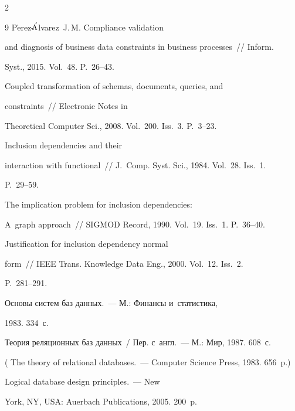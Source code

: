 \begin{multicols}{2}
{{\begin{thebibliography}{9}
{P$\acute{\mbox{e}}$rez-$\acute{\mbox{\!\!A}}$lvarez~J.\,M.} Compliance validation

and diagnosis of business data constraints in business processes~// Inform.

Syst., 2015. Vol.~48. P.~26--43.


 Coupled transformation of schemas, documents, queries, and

constraints~// Electronic Notes in

Theoretical Computer Sci., 2008. Vol.~200. Iss.~3. P.~3--23.






 Inclusion dependencies and their

interaction with functional~// J.~Comp. Syst. Sci., 1984. Vol.~28. Iss.~1.

P.~29--59.


 The implication problem for inclusion dependencies:

A~graph approach~// SIGMOD Record, 1990. Vol.~19. Iss.~1. P.~36--40.


 Justification for inclusion dependency normal

form~// IEEE Trans. Knowledge Data Eng., 2000. Vol.~12. Iss.~2.

P.~281--291.




 Основы систем баз данных.~--- М.: Финансы и~статистика,

1983. 334~с.




 Теория реляционных баз данных~/ Пер. с~англ.~--- М.: Мир, 1987. 608~с.

( The theory of relational databases.~--- Computer Science Press, 1983. 656~p.)




 Logical database design principles.~--- New

York, NY, USA: Auerbach Publications, 2005. 200~p.


\end{thebibliography}}}
\end{multicols}
